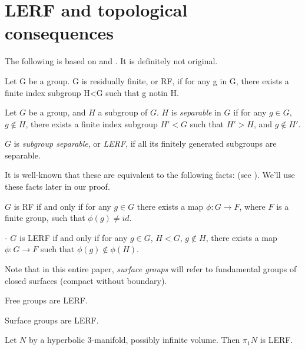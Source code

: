 \section{LERF and topological consequences}

The following is based on \cite{AFW} and \cite{LR}. It is definitely not
original.

\begin{defn}

Let G be a group. G is residually finite, or RF, if for any g in G, there
exists a finite index subgroup H<G such that g notin H.

Let $G$ be a group, and $H$ a subgroup of $G$. $H$ is \emph{separable} in $G$
if for any $g \in G$, $g \notin H$, there exists a finite index subgroup $H'<G$
such that $H'>H$, and $g \notin H'$.

$G$ is \emph{subgroup separable}, or \emph{LERF}, if all its finitely generated
subgroups are separable.

\end{defn}

It is well-known that these are equivalent to the following facts: (see
\cite{LR}). We'll use these facts later in our proof.

$G$ is RF if and only if for any $g \in G$ there exists a map $\phi \colon
G \to F$, where $F$ is a finite group, such that $\phi(g) \neq id$.

- $G$ is LERF if and only if for any $g \in G$, $H < G$, $g \notin H$, there
exists a map $\phi \colon G \to F$ such that $\phi(g) \notin \phi(H)$.

Note that in this entire paper, \emph{surface groups} will refer to fundamental
groups of closed surfaces (compact without boundary).

\begin{thm}[Hall] Free groups are LERF. \end{thm}

\begin{thm}[Scott] Surface groups are LERF. \end{thm}

\begin{thm} Let $N$ by a hyperbolic 3-manifold,
possibly infinite volume.  Then $\pi_1N$ is LERF. \end{thm}

